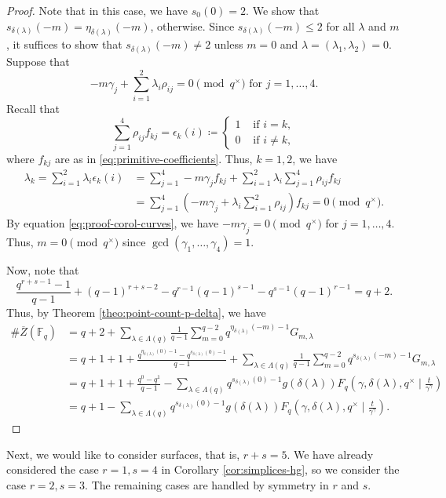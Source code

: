 \documentclass[11pt, reqno]{amsart}
\theoremstyle{plain}
\theoremstyle{definition}
\newcommand{\F}{\mathbb{F}}
\newcommand{\ga}{\gamma}
\begin{document}
\begin{proof}
Note that in this case, we have $s_{0}(0)= 2$. We show that $s_{\delta(\lambda)}(-m) = \eta_{\delta(\lambda)}(-m)$, otherwise.
Since $s_{\delta(\lambda)}(-m) \le 2$ for all $\lambda$ and $m$, it suffices to show that $s_{\delta(\lambda)}(-m) \neq 2$ unless $m=0$ and $\lambda=(\lambda_1,\lambda_2)=0$. 
Suppose that
\begin{equation}\label{eq:proof-corol-curves}
-m \gamma_j +\sum_{i=1}^2 \lambda_i\rho_{ij}= 0 \pmod{q^\times} \text{ for } j=1,\dots,4.    
\end{equation}
Recall that  
\[
\sum_{j=1}^{4} \rho_{ij}f_{kj} = \epsilon_{k}(i)\coloneqq \begin{cases}
    1 & \text{ if } i=k,\\
    0 & \text{ if } i \neq k,
\end{cases}
\]
where $f_{kj}$ are as in \eqref{eq:primitive-coefficients}. Thus, $k=1,2$, we have  
\begin{align*}
 \lambda_k = \sum_{i=1}^2 \lambda_i \epsilon_{k}(i)  &=\sum_{j=1}^{4} -m \gamma_j f_{kj} +\sum_{i=1}^2 \lambda_i\sum_{j=1}^{4}  \rho_{ij} f_{kj} \\
 &= \sum_{j=1}^{4} \left( -m \ga_j + \lambda_i \sum_{i=1}^{2}\rho_{ij} \right) f_{kj} = 0 \pmod{q^\times}.
\end{align*}
By equation \eqref{eq:proof-corol-curves}, we have $-m \gamma_j =0 \pmod{q^\times}$ for $j=1, \dots,4$. Thus, $m=0 \pmod{q^\times}$ since $\gcd(\gamma_1,\dots,\gamma_{4})=1$.

Now, note that 
\[
  \frac{q^{r+s-1}-1}{q-1}+ (q-1)^{r+s-2} -q^{r-1}(q-1)^{s-1}- q^{s-1}(q-1)^{r-1}  =q+2.
\]
Thus, by Theorem \ref{theo:point-count-p-delta}, we have
\begin{align*}
 \#\overline{Z}(\F_q) &= q+2 + \sum_{\lambda \in \Lambda(q)}  \frac{1}{q-1}\sum_{m=0}^{q-2}q^{\eta_{\delta(\lambda)}(-m)-1} G_{m, \lambda}\\
 &= q+1 + 1 + \frac{q^{\eta_{\delta(\lambda)}(0)-1}-q^{s_{\delta(\lambda)}(0)-1}}{q-1} +\sum_{\lambda \in \Lambda(q)}  \frac{1}{q-1}\sum_{m=0}^{q-2}q^{s_{\delta(\lambda)}(-m)-1} G_{m, \lambda}\\
 &=q+1 +1 +\frac{q^0-q^1}{q-1} -\sum_{\lambda \in \Lambda(q)} q^{s_{\delta(\lambda)}(0)-1} g(\delta(\lambda))  F_q\left(\gamma,\delta(\lambda), q^\times \mid \frac{t}{\gamma^\gamma}\right)\\
 &=q+1 -\sum_{\lambda \in \Lambda(q)} q^{s_{\delta(\lambda)}(0)-1} g(\delta(\lambda))  F_q\left(\gamma,\delta(\lambda),q^\times \mid \frac{t}{\gamma^\gamma}\right).
\end{align*}
\end{proof}
Next, we would like to consider surfaces, that is, $r+s=5$. We have already considered the case $r=1,s=4$ in Corollary \ref{cor:simplices-hg}, so we consider the case $r=2,s=3$. The remaining cases are handled by symmetry in $r$ and $s$.
\end{document}
